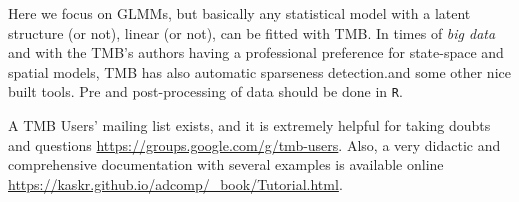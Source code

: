 Here we focus on GLMMs, but basically any statistical model with a
latent structure (or not), linear (or not), can be fitted with TMB. In
times of \textit{big data} and with the TMB's authors having a
professional preference for state-space and spatial models, TMB has
also automatic sparseness detection.and some other nice built tools. Pre
and post-processing of data should be done in \texttt{R}.

A TMB Users' mailing list exists, and it is extremely helpful for taking
doubts and questions \url{https://groups.google.com/g/tmb-users}. Also,
a very didactic and comprehensive documentation with several examples is
available online
\url{https://kaskr.github.io/adcomp/_book/Tutorial.html}.

